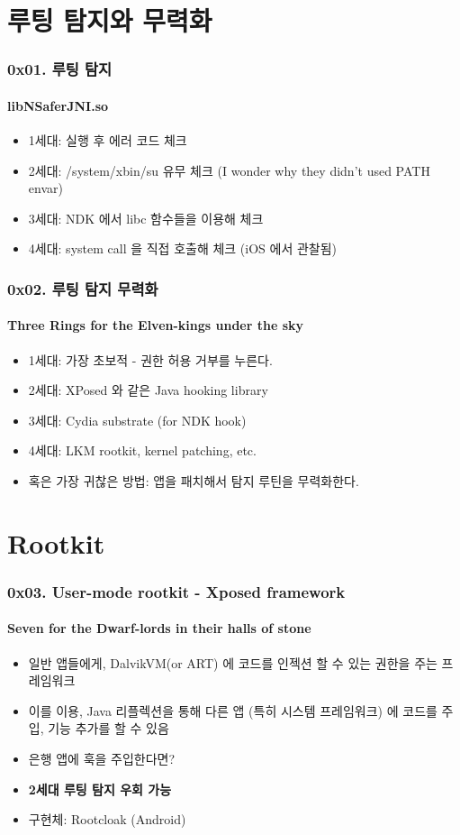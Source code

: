 \section[Section]{루팅 탐지와 무력화}
\begin{frame}
  \frametitle{0x01. 루팅 탐지}
  \framesubtitle{libNSaferJNI.so}

  \begin{itemize}
  \item 1세대: 실행 후 에러 코드 체크
  \item <2-> 2세대: /system/xbin/su 유무 체크 (I wonder why they didn't used PATH envar)
  \item <3-> 3세대: NDK 에서 libc 함수들을 이용해 체크
  \item <4-> 4세대: system call 을 직접 호출해 체크 (iOS 에서 관찰됨)
  \end{itemize}
\end{frame}

\begin{frame}
  \frametitle{0x02. 루팅 탐지 무력화}
  \framesubtitle{Three Rings for the Elven-kings under the sky}

  \begin{itemize}
  \item 1세대: 가장 초보적 - 권한 허용 거부를 누른다.
  \item 2세대: XPosed 와 같은 Java hooking library
  \item 3세대: Cydia substrate (for NDK hook)
  \item 4세대: LKM rootkit, kernel patching, etc.
  \item <2-> 혹은 가장 귀찮은 방법: 앱을 패치해서 탐지 루틴을 무력화한다.
  \end{itemize}
\end{frame}

\section[Section]{Rootkit}
\begin{frame}
  \frametitle{0x03. User-mode rootkit - Xposed framework}
  \framesubtitle{Seven for the Dwarf-lords in their halls of stone}

  \begin{itemize}
  \item <1-> 일반 앱들에게, DalvikVM(or ART) 에 코드를 인젝션 할 수 있는 권한을 주는 프레임워크
  \item <2-> 이를 이용, Java 리플렉션을 통해 다른 앱 (특히 시스템 프레임워크) 에 코드를 주입, 기능 추가를 할 수 있음
  \item <3-> 은행 앱에 훅을 주입한다면?
  \item <4-> \textbf{2세대 루팅 탐지 우회 가능}
  \item <5-> 구현체: Rootcloak (Android)
  \end{itemize}
\end{frame}

